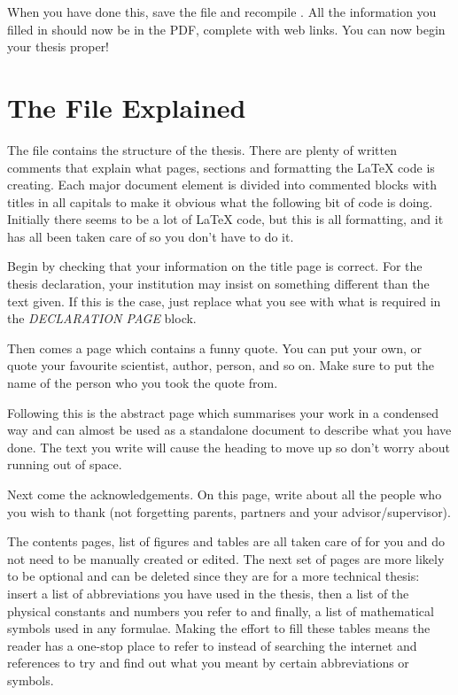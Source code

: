 When you have done this, save the file and recompile . All the information you filled in should now be in the PDF, complete with web links. You can now begin your thesis proper!


\section{The  File Explained}

The  file contains the structure of the thesis. There are plenty of written comments that explain what pages, sections and formatting the \LaTeX{} code is creating. Each major document element is divided into commented blocks with titles in all capitals to make it obvious what the following bit of code is doing. Initially there seems to be a lot of \LaTeX{} code, but this is all formatting, and it has all been taken care of so you don't have to do it.

Begin by checking that your information on the title page is correct. For the thesis declaration, your institution may insist on something different than the text given. If this is the case, just replace what you see with what is required in the \emph{DECLARATION PAGE} block.

Then comes a page which contains a funny quote. You can put your own, or quote your favourite scientist, author, person, and so on. Make sure to put the name of the person who you took the quote from.

Following this is the abstract page which summarises your work in a condensed way and can almost be used as a standalone document to describe what you have done. The text you write will cause the heading to move up so don't worry about running out of space.

Next come the acknowledgements. On this page, write about all the people who you wish to thank (not forgetting parents, partners and your advisor/supervisor).

The contents pages, list of figures and tables are all taken care of for you and
do not need to be manually created or edited. The next set of pages are more
likely to be optional and can be deleted since they are for a more technical
thesis: insert a list of abbreviations you have used in the thesis, then a list
of the physical constants and numbers you refer to and finally, a list of
mathematical symbols used in any formulae. Making the effort to fill these
tables means the reader has a one-stop place to refer to instead of searching
the internet and references to try and find out what you meant by certain
abbreviations or symbols.


